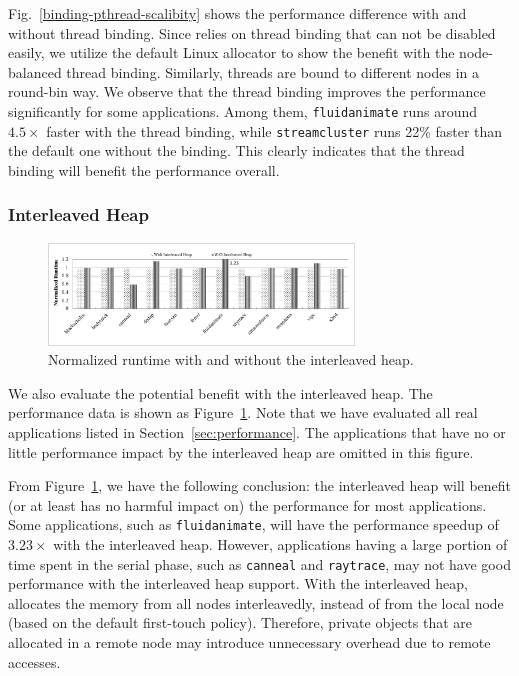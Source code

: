 Fig.~\ref{binding-pthread-scalibity} shows the performance difference with and without thread binding. Since \NM{} relies on thread binding that can not be disabled easily, we utilize the default Linux allocator to show the benefit with the node-balanced thread binding. Similarly, threads are bound to different nodes in a round-bin way. We observe that the thread binding improves the performance significantly for some applications. Among them, \texttt{fluidanimate} runs around $4.5\times$ faster with the thread binding, while \texttt{streamcluster} runs 22\% faster than the default one without the binding. This clearly indicates that the thread binding will benefit the performance overall. 



\subsubsection{Interleaved Heap} 
\label{sec:interleavedheap}

\begin{figure}[!h]
    \centering
    \includegraphics[width=3.2in]{figure/interleavedheap.pdf}
    \caption{Normalized runtime with  and without the interleaved heap.\label{fig:interleavedheap}}  
\end{figure}

We also evaluate the potential benefit with the  interleaved heap. The performance data is shown as Figure~\ref{fig:interleavedheap}. Note that we have evaluated all real applications listed in Section~\ref{sec:performance}. The applications that have no or little performance impact by the interleaved heap are omitted in this figure. 

From Figure~\ref{fig:interleavedheap}, we have the following conclusion: the interleaved heap will benefit (or at least has no harmful impact on) the performance for most applications. Some applications, such as \texttt{fluidanimate}, will have the performance speedup of $3.23\times$ with the interleaved heap. However, applications having a large portion of time spent in the serial phase, such as \texttt{canneal} and \texttt{raytrace}, may not have good performance with the interleaved heap support. With the interleaved heap, \NM{} allocates the memory from all nodes interleavedly, instead of from the local node (based on the default first-touch policy). Therefore, private objects that are allocated in a remote node may introduce unnecessary overhead due to remote accesses.
 
